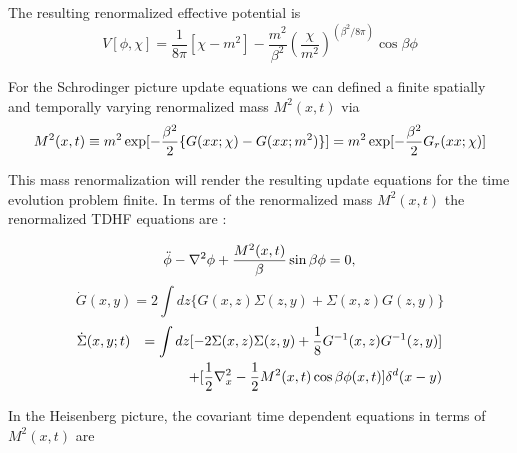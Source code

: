 \documentclass[a4paper,prd,preprint,superscriptaddress,showpacs,byrevtex]{revtex4}
\begin{document}
The resulting renormalized effective potential is
\begin{equation}
V[\phi,\chi] = \frac{1}{8 \pi} [\chi-m^2] - \frac{m^2}{\beta^2} (\frac
{\chi}{m^2})^{(\beta^2/ 8 \pi)}
\cos \beta \phi
\end{equation}

For the Schrodinger picture update equations we can defined a finite
spatially and temporally varying renormalized mass $M^2(x,t)$ via
\begin{equation}
M^2(x,t) \equiv   m^2 \exp[-{\beta^2 \over
2}\{G(xx;\chi)-G(xx;m^2) \} ]= m^2 \exp[-{\beta^2 \over
2}G_r(xx;\chi)]
\end{equation}

This mass renormalization will render the resulting update equations
for the time evolution problem finite.
In terms of the renormalized mass $M^2(x,t)$ the renormalized TDHF equations
are
:

\begin{equation}
\ddot{\phi} - \nabla^2 \phi + {M^2(x,t) \over \beta} \sin \beta \phi
 =0 \label{eq:phir},
\end{equation}
\begin{equation}
\dot{G}(x,y) =  2 \int dz  \{G(x,z) \Sigma(z,y) + \Sigma (x,z) G(z,y) \}
\label{eq:gr}
\end{equation}
\begin{eqnarray}
\dot{\Sigma}(x,y;t)&&=  \int dz[-2 \Sigma (x,z)\Sigma (z,y) + {1 \over 8}
G^{-1}
(x,z)G^{-1} (z,y) ]  \nonumber \\
&& +  [{1 \over 2}\nabla^{2}_{x}
-{1\over 2} M^2(x,t) \cos \beta \phi(x,t)
] \delta^{d}(x-y)
\label{eq:sig2r}
\end{eqnarray}

In the Heisenberg picture, the covariant time dependent equations in terms
of
$M^2(x,t)$ are
\end{document}
